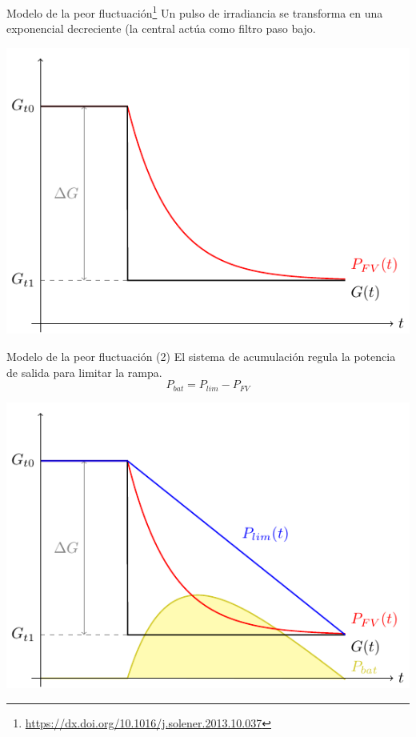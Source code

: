 \documentclass[aspectratio=169, usenames,svgnames,dvipsnames]{beamer}
\begin{document}
\begin{frame}[label={sec:org98ccee7}]{Modelo de la peor fluctuación\footnote{\url{https://dx.doi.org/10.1016/j.solener.2013.10.037}}}
Un pulso de irradiancia se transforma en una exponencial decreciente (la central actúa como filtro paso bajo.

\begin{center}
\includegraphics[height=0.7\textheight]{../figs/ModeloPeorFluctuacion0.pdf}
\end{center}
\end{frame}

\begin{frame}[label={sec:org1fb0e28}]{Modelo de la peor fluctuación (2)}
El sistema de acumulación regula la potencia de salida para limitar la rampa. 
\[
  P_{bat} = P_{lim} - P_{FV}
\]

\begin{center}
\includegraphics[height=0.75\textheight]{../figs/ModeloPeorFluctuacion.pdf}
\end{center}
\end{frame}
\end{document}
